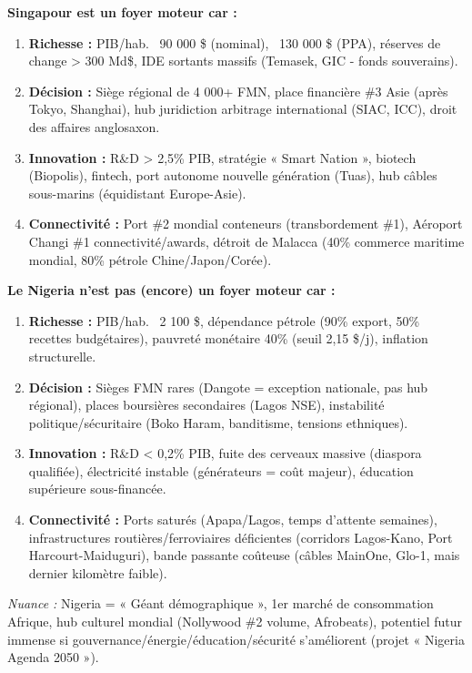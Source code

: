 \documentclass[11pt]{article}
\begin{document}
\begin{corrige}[Exercice 1]
\textbf{Singapour est un foyer moteur car :}
\begin{enumerate}
    \item \textbf{Richesse :} PIB/hab. ~90 000 \$ (nominal), ~130 000 \$ (PPA), réserves de change > 300 Md\$, IDE sortants massifs (Temasek, GIC - fonds souverains).
    \item \textbf{Décision :} Siège régional de 4 000+ FMN, place financière \#3 Asie (après Tokyo, Shanghai), hub juridiction arbitrage international (SIAC, ICC), droit des affaires anglosaxon.
    \item \textbf{Innovation :} R\&D > 2,5\% PIB, stratégie « Smart Nation », biotech (Biopolis), fintech, port autonome nouvelle génération (Tuas), hub câbles sous-marins (équidistant Europe-Asie).
    \item \textbf{Connectivité :} Port \#2 mondial conteneurs (transbordement \#1), Aéroport Changi \#1 connectivité/awards, détroit de Malacca (40\% commerce maritime mondial, 80\% pétrole Chine/Japon/Corée).
\end{enumerate}
\textbf{Le Nigeria n'est pas (encore) un foyer moteur car :}
\begin{enumerate}
    \item \textbf{Richesse :} PIB/hab. ~2 100 \$, dépendance pétrole (90\% export, 50\% recettes budgétaires), pauvreté monétaire 40\% (seuil 2,15 \$/j), inflation structurelle.
    \item \textbf{Décision :} Sièges FMN rares (Dangote = exception nationale, pas hub régional), places boursières secondaires (Lagos NSE), instabilité politique/sécuritaire (Boko Haram, banditisme, tensions ethniques).
    \item \textbf{Innovation :} R\&D < 0,2\% PIB, fuite des cerveaux massive (diaspora qualifiée), électricité instable (générateurs = coût majeur), éducation supérieure sous-financée.
    \item \textbf{Connectivité :} Ports saturés (Apapa/Lagos, temps d'attente semaines), infrastructures routières/ferroviaires déficientes (corridors Lagos-Kano, Port Harcourt-Maiduguri), bande passante coûteuse (câbles MainOne, Glo-1, mais dernier kilomètre faible).
\end{enumerate}
\textit{Nuance :} Nigeria = « Géant démographique », 1er marché de consommation Afrique, hub culturel mondial (Nollywood \#2 volume, Afrobeats), potentiel futur immense si gouvernance/énergie/éducation/sécurité s'améliorent (projet « Nigeria Agenda 2050 »).
\end{corrige}
\end{document}
